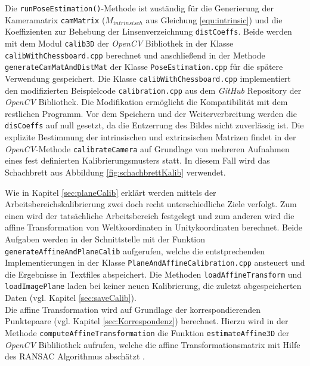 Die \texttt{runPoseEstimation()}-Methode ist zuständig für die Generierung der Kameramatrix \texttt{camMatrix}  ($M_{intrinsisch}$ aus Gleichung \ref{equ:intrinsic})  und die Koeffizienten zur Behebung der Linsenverzeichnung \texttt{distCoeffs}. Beide werden mit dem Modul \texttt{calib3D} der \textit{OpenCV} Bibliothek in der Klasse \texttt{calibWithChessboard.cpp} berechnet und anschließend in der Methode \texttt{generateCamMatAndDistMat} der Klasse \texttt{PoseEstimation.cpp} für die spätere  Verwendung gespeichert. 
Die Klasse \texttt{calibWithChessboard.cpp} implementiert den modifizierten Beispielcode \texttt{calibration.cpp} \cite{website:calibexample} aus dem \textit{GitHub} Repository der \textit{OpenCV} Bibliothek. Die Modifikation ermöglicht die Kompatibilität mit dem restlichen Programm. Vor dem Speichern und der Weiterverbreitung werden die \texttt{disCoeffs} auf null gesetzt, da die Entzerrung des Bildes nicht zuverlässig ist. Die explizite Bestimmung der intrinsischen und extrinsischen Matrizen findet in der \textit{OpenCV}-Methode \texttt{calibrateCamera} auf Grundlage von mehreren Aufnahmen eines fest definierten Kalibrierungsmusters statt. In diesem Fall wird das Schachbrett aus Abbildung \ref{fig:schachbrettKalib} verwendet. 

Wie in Kapitel \ref{sec:planeCalib} erklärt werden mittels der Arbeitsbereichskalibrierung zwei doch recht unterschiedliche Ziele verfolgt. Zum einen wird der tatsächliche Arbeitsbereich festgelegt und zum anderen wird die affine Transformation von Weltkoordinaten in Unitykoordinaten berechnet. Beide Aufgaben werden in der Schnittstelle mit der Funktion \texttt{generateAffineAndPlaneCalib} aufgerufen, welche die entstprechenden Implementierungen in der Klasse \texttt{PlaneAndAffineCalibration.cpp} ansteuert und die Ergebnisse in Textfiles abspeichert. Die Methoden \texttt{loadAffineTransform} und \texttt{loadImagePlane} laden bei keiner neuen Kalibrierung, die zuletzt abgespeicherten Daten (vgl. Kapitel \ref{sec:saveCalib}). \\

Die affine Transformation wird auf Grundlage der korrespondierenden Punktepaare (vgl. Kapitel \ref{sec:Korrespondenz}) berechnet. Hierzu wird in der Methode \texttt{computeAffineTransformation} die Funktion \texttt{estimateAffine3D} der \textit{OpenCV} Bibliliothek aufrufen, welche die affine Transformationsmatrix mit Hilfe des RANSAC Algorithmus abschätzt \cite{articel:RANSAC}.

